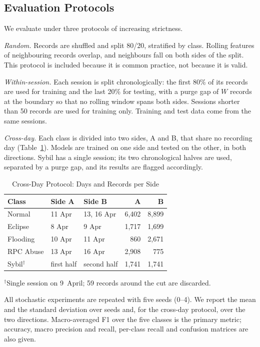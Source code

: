 \documentclass[journal]{IEEEtran}
\begin{document}
\subsection{Evaluation Protocols}\label{sec:protocols}
We evaluate under three protocols of increasing strictness.

\emph{Random.} Records are shuffled and split 80/20, stratified by class. Rolling features of neighbouring records overlap, and neighbours fall on both sides of the split. This protocol is included because it is common practice, not because it is valid.

\emph{Within-session.} Each session is split chronologically: the first 80\% of its records are used for training and the last 20\% for testing, with a purge gap of $W$ records at the boundary so that no rolling window spans both sides. Sessions shorter than 50 records are used for training only. Training and test data come from the same sessions.

\emph{Cross-day.} Each class is divided into two sides, A and B, that share no recording day (Table~\ref{tab:folds}). Models are trained on one side and tested on the other, in both directions. Sybil has a single session; its two chronological halves are used, separated by a purge gap, and its results are flagged accordingly.

\begin{table}[t]
\caption{Cross-Day Protocol: Days and Records per Side}\label{tab:folds}
\centering\footnotesize
\begin{tabular}{@{}lllrr@{}}
\toprule
Class & Side A & Side B & A & B \\
\midrule
Normal & 11 Apr & 13, 16 Apr & 6{,}402 & 8{,}899 \\
Eclipse & 8 Apr & 9 Apr & 1{,}717 & 1{,}699 \\
Flooding & 10 Apr & 11 Apr & 860 & 2{,}671 \\
RPC Abuse & 13 Apr & 16 Apr & 2{,}908 & 775 \\
Sybil$^{\dagger}$ & first half & second half & 1{,}741 & 1{,}741 \\
\bottomrule
\end{tabular}
\vspace{2pt}

{\raggedright\scriptsize $^{\dagger}$Single session on 9~April; 59 records around the cut are discarded.\par}
\end{table}

All stochastic experiments are repeated with five seeds (0--4). We report the mean and the standard deviation over seeds and, for the cross-day protocol, over the two directions. Macro-averaged F1 over the five classes is the primary metric; accuracy, macro precision and recall, per-class recall and confusion matrices are also given.
\end{document}
